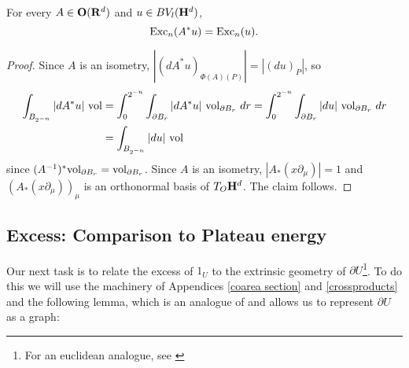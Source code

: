 \begin{lemma}\label{excess rotation invariant}
For every $A \in \mathbf{O}(\mathbf{R}^d)$ and $u \in BV_l(\mathbf H^d)$,
$$\operatorname{Exc}_n(A^* u) = \operatorname{Exc}_n(u).$$
\end{lemma}
\begin{proof}
Since $A$ is an isometry, $|(d A^* u)_{\Phi(A)(P)}| = |(du)_P|$, so
\begin{align*}
\int_{B_{2^{-n}}} |dA^*u| ~\mathrm{vol} &= \int_0^{2^{-n}} \int_{\partial B_r} |dA^* u| ~\mathrm{vol}_{\partial B_r} ~dr = \int_0^{2^{-n}} \int_{\partial B_r} |du| ~\mathrm{vol}_{\partial B_r} ~dr\\
&= \int_{B_{2^{-n}}} |du| ~\mathrm{vol}
\end{align*}
since $(A^{-1})^* \mathrm{vol}_{\partial B_r} = \mathrm{vol}_{\partial B_r}$.
Since $A$ is an isometry, $|A_* (x \partial_\mu)| = 1$ and $(A_*(x \partial_\mu))_\mu$ is an orthonormal basis of $T_O \mathbf H^d$.
The claim follows.
\end{proof}

\subsection{Excess: Comparison to Plateau energy}
Our next task is to relate the excess of $1_U$ to the extrinsic geometry of $\partial U$\footnote{For an euclidean analogue, see \cite[TODO]{Miranda66}}.
To do this we will use the machinery of Appendices \ref{coarea section} and \ref{crossproducts} and the following lemma, which is an analogue of \cite[Theorem 4.8]{Giusti77} and allows us to represent $\partial U$ as a graph:

